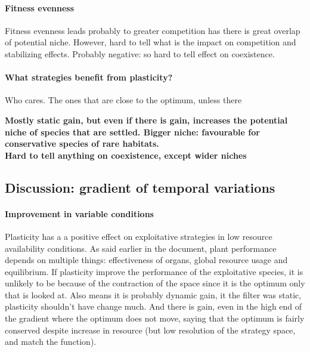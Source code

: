 
\paragraph{Fitness evenness}

Fitness evenness leads probably to greater competition has there is great overlap of potential niche. However, hard to tell what is the impact on competition and stabilizing effects. Probably negative: so hard to tell effect on coexistence.

\paragraph{What strategies benefit from plasticity?}

Who cares. The ones that are close to the optimum, unless there

\textbf{Mostly static gain, but even if there is gain, increases the potential niche of species that are settled. Bigger niche: favourable for conservative species of rare habitats.\\
Hard to tell anything on coexistence, except wider niches}


\subsection{Discussion: gradient of temporal variations}


\paragraph{Improvement in variable conditions}
Plasticity has a a positive effect on exploitative strategies in low resource availability conditions. As said earlier in the document, plant performance depends on multiple things: effectiveness of organs, global resource usage and equilibrium. 
If plasticity improve the performance of the exploitative species, it is unlikely to be because of the contraction of the space since it is the optimum only that is looked at. Also means it is probably dynamic gain, it the filter was static, plasticity shouldn't have change much. And there is gain, even in the high end of the gradient where the optimum does not move, saying that the optimum is fairly conserved despite increase in resource (but low resolution of the strategy space, and match the function). 

